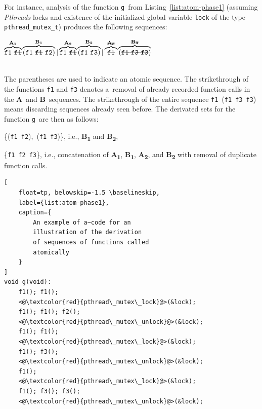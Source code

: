 \documentclass{ExcelAtFIT}
\begin{document}
For instance, analysis of the
function \texttt{g}~from
Listing~\ref{list:atom-phase1} (assuming
\emph{Pthreads} locks and existence of the
initialized global variable \texttt{lock} of
the type \texttt{pthr\-ead\_mutex\_t})
produces the following sequences:
\\[0.4em]
\centerline{$
    \overbrace{
        \text{\texttt{f1} \sout{\texttt{f1}}}
    }^\text{\textbf{A\textsubscript{1}}}
    \overbrace{
        (\text{\texttt{f1} \sout{\texttt{f1}} \texttt{f2}})
    }^\text{\textbf{B\textsubscript{1}}} |
    \overbrace{
        \text{\texttt{f1} \sout{\texttt{f1}}}
    }^\text{\textbf{A\textsubscript{2}}}
    \overbrace{
        (\text{\texttt{f1} \texttt{f3}})
    }^\text{\textbf{B\textsubscript{2}}} |
    \overbrace{
        \text{\sout{\texttt{f1}}}
    }^\text{\sout{\textbf{A\textsubscript{3}}}}
    \overbrace{
        (\text{\sout{\texttt{f1} \texttt{f3} \texttt{f3}}})
    }^\text{\sout{\textbf{B\textsubscript{3}}}}
$}
\\[0.4em]
The parentheses are used to indicate an atomic
sequence. The strikethrough of the functions
\texttt{f1} and \texttt{f3} denotes a~removal of
already recorded function calls in the
\textbf{A}~and \textbf{B}~sequences.
The strikethrough of the entire sequence
\texttt{f1}~(\texttt{f1}~\texttt{f3}~\texttt{f3})
means discarding sequences already seen before.
The derivated sets for the
function \texttt{g}~are then as follows:
\begin{enumerate*}[label={(\roman*)}, topsep=0.4em]
    \item
       \{(\texttt{f1}~\texttt{f2}),~(\texttt{f1}~\texttt{f3})\}, i.e.,
       \textbf{B\textsubscript{1}} and \textbf{B\textsubscript{2}},

    \item
        \{\texttt{f1}~\texttt{f2}~\texttt{f3}\}, i.e.,
        concatenation of \textbf{A\textsubscript{1}},
        \textbf{B\textsubscript{1}}, \textbf{A\textsubscript{2}},
        and \textbf{B\textsubscript{2}} with removal of duplicate
        function calls.

\end{enumerate*}

\begin{lstlisting}[
    float=tp, belowskip=-1.5 \baselineskip,
    label={list:atom-phase1},
    caption={
        An example of a~code for an
        illustration of the derivation
        of sequences of functions called
        atomically
    }
]
void g(void):
    f1(); f1();
    <@\textcolor{red}{pthread\_mutex\_lock}@>(&lock);
    f1(); f1(); f2();
    <@\textcolor{red}{pthread\_mutex\_unlock}@>(&lock);
    f1(); f1();
    <@\textcolor{red}{pthread\_mutex\_lock}@>(&lock);
    f1(); f3();
    <@\textcolor{red}{pthread\_mutex\_unlock}@>(&lock);
    f1();
    <@\textcolor{red}{pthread\_mutex\_lock}@>(&lock);
    f1(); f3(); f3();
    <@\textcolor{red}{pthread\_mutex\_unlock}@>(&lock);
\end{lstlisting}
\end{document}

